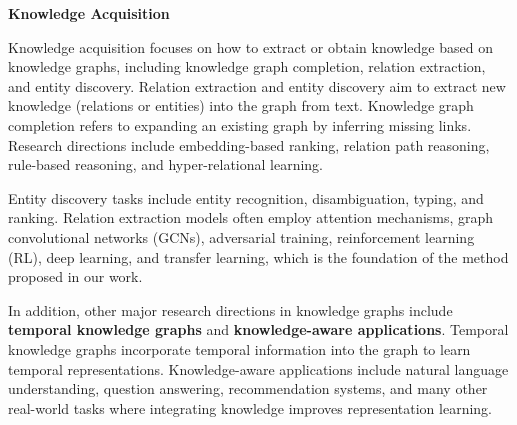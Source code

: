 \textbf{Knowledge Acquisition}

Knowledge acquisition focuses on how to extract or obtain knowledge based on knowledge graphs, including knowledge graph completion, relation extraction, and entity discovery. Relation extraction and entity discovery aim to extract new knowledge (relations or entities) into the graph from text. Knowledge graph completion refers to expanding an existing graph by inferring missing links. Research directions include embedding-based ranking, relation path reasoning, rule-based reasoning, and hyper-relational learning.

Entity discovery tasks include entity recognition, disambiguation, typing, and ranking. Relation extraction models often employ attention mechanisms, graph convolutional networks (GCNs), adversarial training, reinforcement learning (RL), deep learning, and transfer learning, which is the foundation of the method proposed in our work.

In addition, other major research directions in knowledge graphs include \textbf{temporal knowledge graphs} and \textbf{knowledge-aware applications}. Temporal knowledge graphs incorporate temporal information into the graph to learn temporal representations. Knowledge-aware applications include natural language understanding, question answering, recommendation systems, and many other real-world tasks where integrating knowledge improves representation learning.





